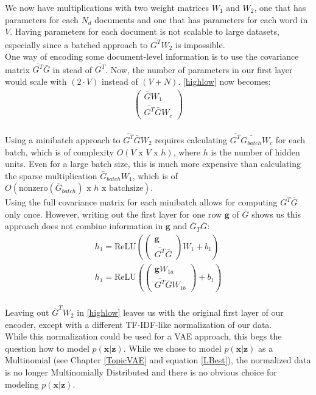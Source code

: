 \documentclass{report}
\begin{document}
\begin{appendices}
	We now have multiplications with two weight matrices $W_1$ and $W_2$, one that has parameters for each $N_d$ documents and one that has parameters for each word in $V$. Having parameters for each document is not scalable to large datasets, especially since a batched approach to $\bar{G^T}W_2$ is impossible.\\
	One way of encoding some document-level information is to use the covariance matrix $\bar{G^T}\bar{G}$ in stead of $\bar{G^T}$. Now, the number of parameters in our first layer would scale with $(2\cdot V)$ instead of $(V+N)$. \ref{highlow} now becomes:
	\\
	\begin{align}
	\left(\begin{matrix}
	\bar{G}W_1 \\
	\bar{G^T}\bar{G}W_c
	\end{matrix}\right)
	\end{align}
	\\
	Using a minibatch approach to $\bar{G^T}\bar{G}W_2$ requires calculating $\bar{G^T}\bar{G_{batch}}W_c$ for each batch, which is of complexity $O(V\text{ x }V \text{ x } h)$, where $h$ is the number of hidden units. Even for a large batch size, this is much more expensive than calculating the sparse multiplication $\bar{G}_{batch}W_1$, which is of $O(\text{nonzero}(\bar{G}_{batch}) \text{ x } h \text{ x } \text{batchsize})$. 
	\\
	Using the full covariance matrix for each minibatch allows for computing $\bar{G^T}\bar{G}$ only once. However, writing out the first layer for one row $\mathbf{g}$ of $\bar{G}$ shows us this approach does not combine information in $\mathbf{g}$ and $\bar{G}_T\bar{G}$:
	\begin{align}
	h_1 = \text{ReLU}(
	\left(\begin{matrix}
	\mathbf{g} \\
	\bar{G^T}\bar{G}
	\end{matrix}\right)W_1 +b_1)
	\\
	h_1 = 
	\text{ReLU}(\left(\begin{matrix}
	\mathbf{g}W_{1a} \\
	\bar{G^T}\bar{G}W_{1b}
	\end{matrix}\right) + b_1)
	\end{align}
	\\
	Leaving out $\bar{G}^TW_2$ in \ref{highlow} leaves us with the original first layer of our encoder, except with a different TF-IDF-like normalization of our data. \\ While this normalization could be used for a VAE approach, this begs the question how to model $p(\mathbf{x|z})$. While we chose to model $p(\mathbf{x|z})$ as a Multinomial (see Chapter \ref{TopicVAE} and equation \ref{LBest}), the normalized data is no longer Multinomially Distributed and there is no obvious choice for modeling $p(\mathbf{x|z})$.
\end{appendices}
\end{document}
